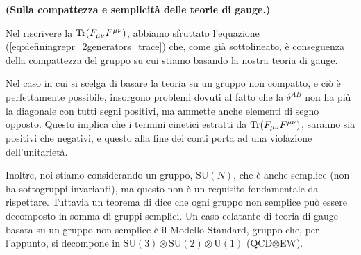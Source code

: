 \documentclass[../main.tex]{subfiles}
\begin{document}
\begin{nota}
    \textbf{(Sulla compattezza e semplicità delle teorie di gauge.)}

    Nel riscrivere la $\Tr(F_{\mu\nu}F^{\mu\nu})$, abbiamo sfruttato l'equazione (\ref{eq:definingrepr_2generators_trace}) che, come già sottolineato, è conseguenza della compattezza del gruppo su cui stiamo basando la nostra teoria di gauge. 

    Nel caso in cui si scelga di basare la teoria su un gruppo non compatto, e ciò è perfettamente possibile, insorgono problemi dovuti al fatto che la $\delta^{AB}$ non ha più la diagonale con tutti segni positivi, ma ammette anche elementi di segno opposto. Questo implica che i termini cinetici estratti da $\Tr(F_{\mu\nu}F^{\mu\nu})$, saranno sia positivi che negativi, e questo alla fine dei conti porta ad una violazione dell'unitarietà.

    Inoltre, noi stiamo considerando un gruppo, $\textrm{SU}(N)$, che è anche semplice (non ha sottogruppi invarianti), ma questo non è un requisito fondamentale da rispettare. Tuttavia un teorema di dice che ogni gruppo non semplice può essere decomposto in somma di gruppi semplici. Un caso eclatante di teoria di gauge basata su un gruppo non semplice è il Modello Standard, gruppo che, per l'appunto, si decompone in $\textrm{SU}(3)\otimes \textrm{SU}(2)\otimes \textrm{U}(1)$ (QCD$\otimes$EW).
\end{nota}
\end{document}
